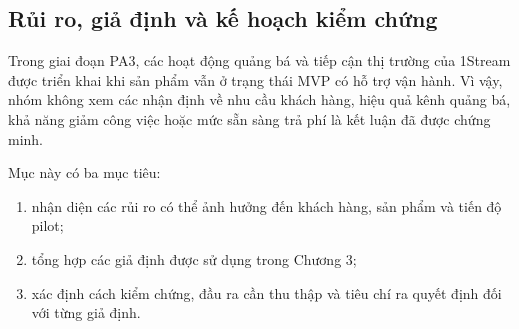 %
%
%
%
%


\subsection{Rủi ro, giả định và kế hoạch kiểm chứng}

Trong giai đoạn PA3, các hoạt động quảng bá và tiếp cận thị trường của 1Stream được triển khai khi sản phẩm vẫn ở trạng thái MVP có hỗ trợ vận hành. Vì vậy, nhóm không xem các nhận định về nhu cầu khách hàng, hiệu quả kênh quảng bá, khả năng giảm công việc hoặc mức sẵn sàng trả phí là kết luận đã được chứng minh.

Mục này có ba mục tiêu:

\begin{enumerate}
    \item nhận diện các rủi ro có thể ảnh hưởng đến khách hàng, sản phẩm và tiến độ pilot;
    \item tổng hợp các giả định được sử dụng trong Chương 3;
    \item xác định cách kiểm chứng, đầu ra cần thu thập và tiêu chí ra quyết định đối với từng giả định.
\end{enumerate}

